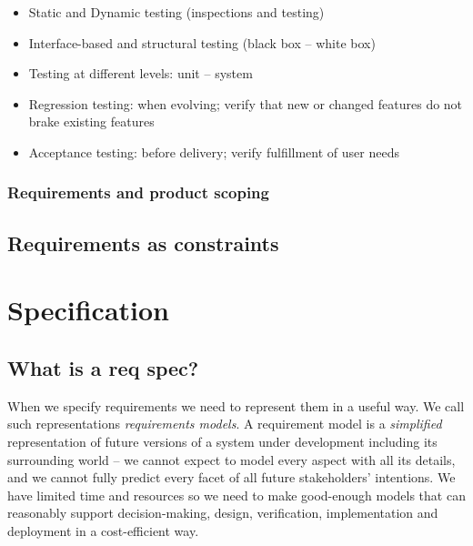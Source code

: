 \begin{itemize}
  \item Static and Dynamic testing (inspections and testing)
  \item Interface-based and structural testing (black box -- white box)
  \item Testing at different levels: unit -- system
  \item Regression testing: when evolving; verify that new or changed features do not brake existing features
  \item Acceptance testing: before delivery; verify fulfillment of user needs
\end{itemize}


\subsubsection{Requirements and product scoping}



\subsection{Requirements as constraints}


\section{Specification}



\subsection{What is a req spec?}


When we specify requirements we need to represent them in a useful way. We call such representations \textit{requirements models}. A requirement model is a \emph{simplified} representation of future versions of a system under development including its surrounding world -- we cannot expect to model every aspect with all its details, and we cannot fully predict every facet of all future stakeholders' intentions. We have limited time and resources so we need to make good-enough models that can reasonably support decision-making, design, verification, implementation and deployment in a cost-efficient way.

